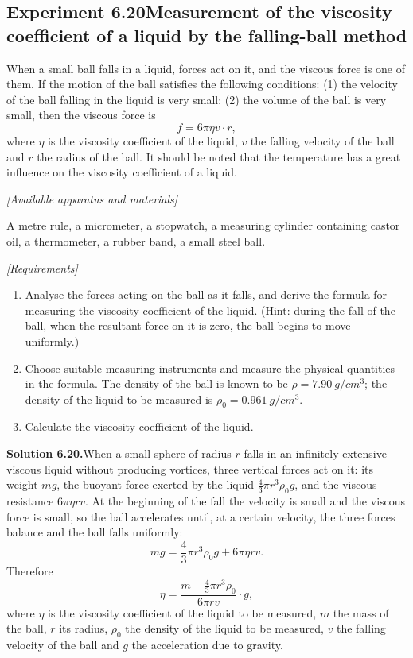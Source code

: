 \subsection*{Experiment 6.20\quad Measurement of the viscosity coefficient of a liquid by the falling-ball method}

When a small ball falls in a liquid, forces act on it, and the viscous force is one of them. If the motion of the ball satisfies the following conditions: (1) the velocity of the ball falling in the liquid is very small; (2) the volume of the ball is very small, then the viscous force is
\begin{equation*}
f=6\pi\eta v\cdot r,
\end{equation*}
where $\eta$ is the viscosity coefficient of the liquid, $v$ the falling velocity of the ball and $r$ the radius of the ball. It should be noted that the temperature has a great influence on the viscosity coefficient of a liquid.

\noindent\textit{[Available apparatus and materials]}

A metre rule, a micrometer, a stopwatch, a measuring cylinder containing castor oil, a thermometer, a rubber band, a small steel ball.

\noindent\textit{[Requirements]}
\begin{enumerate}[label=(\arabic*),leftmargin=2.2em,itemsep=1pt,topsep=2pt]
\item Analyse the forces acting on the ball as it falls, and derive the formula for measuring the viscosity coefficient of the liquid. (Hint: during the fall of the ball, when the resultant force on it is zero, the ball begins to move uniformly.)
\item Choose suitable measuring instruments and measure the physical quantities in the formula. The density of the ball is known to be $\rho=\SI{7.90}{g/cm^3}$; the density of the liquid to be measured is $\rho_0=\SI{0.961}{g/cm^3}$.
\item Calculate the viscosity coefficient of the liquid.
\end{enumerate}

\medskip
\noindent\textbf{Solution 6.20.}\quad When a small sphere of radius $r$ falls in an infinitely extensive viscous liquid without producing vortices, three vertical forces act on it: its weight $mg$, the buoyant force exerted by the liquid $\frac{4}{3}\pi r^{3}\rho_0 g$, and the viscous resistance $6\pi\eta rv$. At the beginning of the fall the velocity is small and the viscous force is small, so the ball accelerates until, at a certain velocity, the three forces balance and the ball falls uniformly:
\begin{equation*}
mg=\frac{4}{3}\pi r^{3}\rho_0 g+6\pi\eta rv .
\end{equation*}
Therefore
\begin{equation}\tag{1}
\eta=\frac{m-\frac{4}{3}\pi r^{3}\rho_0}{6\pi rv}\cdot g ,
\end{equation}
where $\eta$ is the viscosity coefficient of the liquid to be measured, $m$ the mass of the ball, $r$ its radius, $\rho_0$ the density of the liquid to be measured, $v$ the falling velocity of the ball and $g$ the acceleration due to gravity.

